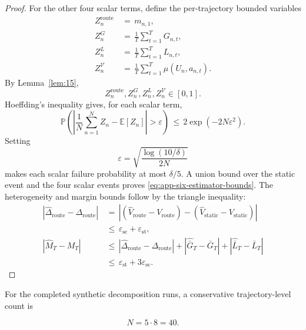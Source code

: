 \documentclass{article} %
\begin{document}
\begin{proof}
For the other four scalar terms, define the per-trajectory bounded variables
\begin{align}
\label{eq:app-six-proof-Z-defs}
Z_n^{\mathrm{route}}
&\,=\,
m_{n,1},
\\
Z_n^{G}
&\,=\,
\frac{1}{T}\sum_{t=1}^{T}G_{n,t},
\\
Z_n^{L}
&\,=\,
\frac{1}{T}\sum_{t=1}^{T}L_{n,t},
\\
Z_n^{\mathcal{V}}
&\,=\,
\frac{1}{T}\sum_{t=1}^{T}\mu(U_n,a_{n,t}).
\end{align}
By Lemma~\ref{lem:15},
\begin{equation}
\label{eq:app-six-proof-Z-bounded}
Z_n^{\mathrm{route}},
Z_n^{G},
Z_n^{L},
Z_n^{\mathcal{V}}
\in[0,1].
\end{equation}
Hoeffding's inequality gives, for each scalar term,
\begin{equation}
\label{eq:app-six-proof-scalar-hoeffding}
\mathbb{P}\!\left(
\left|
\frac{1}{N}\sum_{n=1}^{N}Z_n-\mathbb{E}[Z_n]
\right|>\varepsilon
\right)
\,\le\,
2\exp(-2N\varepsilon^2).
\end{equation}
Setting
\begin{equation}
\label{eq:app-six-proof-scalar-eps}
\varepsilon
=
\sqrt{\frac{\log(10/\delta)}{2N}}
\end{equation}
makes each scalar failure probability at most \(\delta/5\).  A union bound over the static event and the four scalar events proves \eqref{eq:app-six-estimator-bounds}.  The heterogeneity and margin bounds follow by the triangle inequality:
\begin{align}
\label{eq:app-six-proof-delta-triangle}
\left|
\widehat\Delta_{\mathrm{route}}-\Delta_{\mathrm{route}}
\right|
&\,=\,
\left|
(\widehat V_{\mathrm{route}}-V_{\mathrm{route}})
-
(\widehat V_{\mathrm{static}}-V_{\mathrm{static}})
\right|
\\
&\,\le\,
\varepsilon_{\mathrm{sc}}
+
\varepsilon_{\mathrm{st}},
\\
|\widehat M_T-M_T|
&\,\le\,
|\widehat\Delta_{\mathrm{route}}-\Delta_{\mathrm{route}}|
+
|\widehat{\bar G}_T-\bar G_T|
+
|\widehat{\bar L}_T-\bar L_T|
\\
&\,\le\,
\varepsilon_{\mathrm{st}}+3\varepsilon_{\mathrm{sc}}.
\end{align}
\end{proof}

For the completed synthetic decomposition runs, a conservative trajectory-level count is

\begin{equation}
\label{eq:app-six-estimator-example-N}
N=5\cdot 8=40.
\end{equation}
\end{document}
